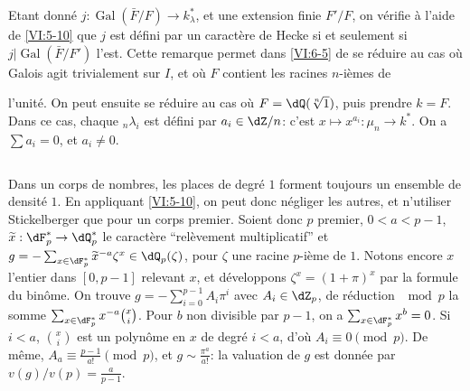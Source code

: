 \documentclass[oneside]{book}
\DeclareMathOperator{\gal}{Gal}
\theoremstyle{sga-source}
\theoremstyle{sga-source-dash}
\theoremstyle{sga-source-dotdash}
\theoremstyle{sga-source-number-note-dash}
\theoremstyle{sga-source-note-number-dotdash}
\theoremstyle{sga-source-example-dotdash}
\theoremstyle{sga-source-inline-number}
\theoremstyle{sga-source-bare-number}
\theoremstyle{sga-source}
\newcommand{\PrintPage}[1]{}\newcommand{\MathPage}[1]{}\newcommand{\PrintCite}[2]{#1}\newcommand{\var}[3]{#2}
\begin{document}
Etant donné $j:\gal(\bar F/F) \to k_\lambda^\ast$, et une extension finie 
$F'/F$, on vérifie à l'aide de \ref{VI:5-10} que $j$ est défini par un 
caractère de Hecke si et seulement si $j|\gal(\bar F/F')$ l'est. Cette 
remarque permet dans \ref{VI:6-5} de se réduire au cas où Galois agit 
trivialement sur $I$, et où $F$ contient les racines $n$-ièmes de 
\PrintPage{216}
l'unité. On peut ensuite se réduire au cas où $F=\dQ(\sqrt[n]{1})$, puis 
prendre $k=F$. Dans ce cas, chaque $_n \lambda_i$ est défini par 
$a_i\in \dZ/n$: c'est $x\mapsto x^{a_i}:\mu_n \to k^\ast$. On a 
$\sum a_i=0$, et $a_i\ne 0$. 





\subsection{}\label{VI:6-7}

Dans un corps de nombres, les places de degré $1$ forment toujours un 
\var{ensemble de densité $0$}{ensemble de densité $1$}{S45-SOL-0908}. En appliquant \ref{VI:5-10}, on peut donc négliger 
les autres, et n'utiliser Stickelberger que pour un corps premier. Soient donc 
$p$ premier, $0<a<p-1$, $\widetilde x:\dF_p^\ast \to \dQ_p^\ast$ le 
caractère ``relèvement multiplicatif'' et 
$g=-\sum_{x\in \dF_p^\ast} \widetilde x^{-a} \zeta^x\in \dQ_p(\zeta)$, pour 
$\zeta$ une racine $p$-ième de $1$. Notons encore $x$ l'entier dans $[0,p-1]$ 
relevant $x$, et développons $\zeta^x=(1+\pi)^x$ par la formule du binôme. 
On trouve $g=-\sum_{i=0}^{p-1} A_i\pi^i$ avec $A_i\in \dZ_p$, de réduction 
$\mod p$ la somme $\sum_{x\in \dF_p^\ast} x^{-a} \binom x i$. Pour $b$ non 
divisible par $p-1$, on a $\sum_{x\in \dF_p^\ast} x^b=0$. Si $i<a$, 
$\binom x i$ est un polynôme en $x$ de degré $i<a$, d'où 
$A_i\equiv 0\pmod p$. De même, $A_a\equiv \frac{p-1}{a!} \pmod p$, et 
$g\sim \frac{\pi^a}{a!}$: la valuation de $g$ est donnée par 
$v(g)/v(p) = \frac{a}{p-1}$. 





\subsection{}\label{VI:6-8}
\end{document}
